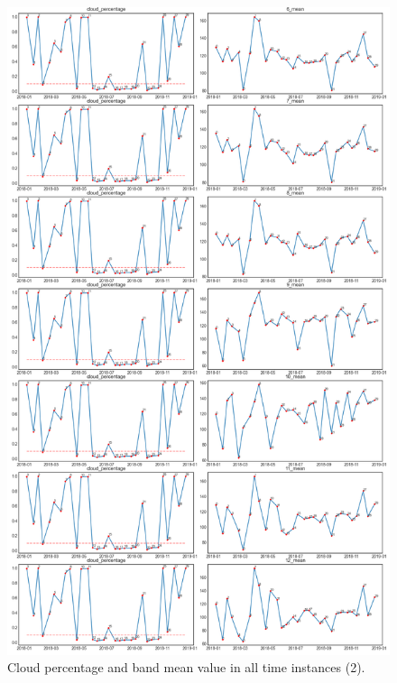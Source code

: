 \documentclass[../main.tex]{subfiles}
\begin{document}
\begin{appendices}
\begin{figure}[H]
	\includegraphics[width=15cm]{imgs/eda/merge/cloud-percentage-each-time-interval-band-2}
	\caption{Cloud percentage and band mean value in all time instances (2).}
	\label{fig:eda-merge-patch-xploration-band-2}
\end{figure}
\begin{figure}[H]
	\centering

\end{figure}
\end{appendices}
\end{document}
